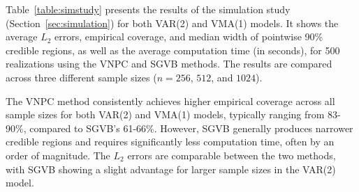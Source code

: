 \documentclass[%
 reprint,
 amsmath,amssymb,
 aps,
 nofootinbib,
]{revtex4-2}
\begin{document}
Table~\ref{table:simstudy} presents the results of the simulation study (Section~\ref{sec:simulation}) for both VAR(2) and VMA(1) models. It shows the average $L_2$ errors, empirical coverage, and median width of pointwise 90\% credible regions, as well as the average computation time (in seconds), for 500 realizations using the VNPC and \ac{SGVB} methods. The results are compared across three different sample sizes ($n=256$, $512$, and $1024$).




The VNPC method consistently achieves higher empirical coverage across all sample sizes for both VAR(2) and VMA(1) models, typically ranging from 83-90\%, compared to SGVB's 61-66\%. However, SGVB generally produces narrower credible regions and requires significantly less computation time, often by an order of magnitude. The $L_2$ errors are comparable between the two methods, with SGVB showing a slight advantage for larger sample sizes in the VAR(2) model.






\end{document}
